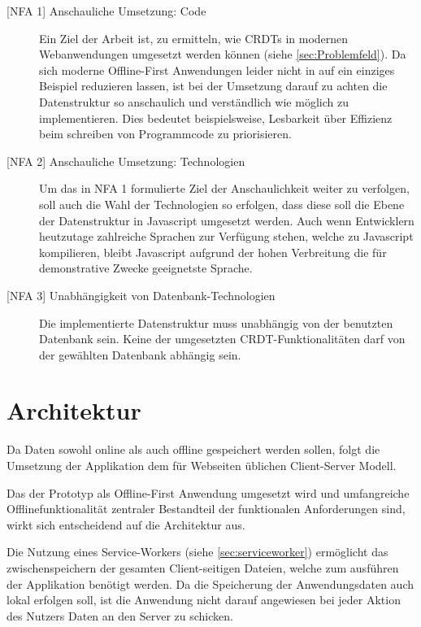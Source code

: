 \documentclass[a4paper, 12pt]{scrreprt}
\begin{document}
\begin{description}
	\item[{[NFA 1]} Anschauliche Umsetzung: Code]
	Ein Ziel der Arbeit ist, zu ermitteln, wie CRDTs in modernen Webanwendungen umgesetzt werden können (siehe \ref{sec:Problemfeld}). Da sich moderne Offline-First Anwendungen leider nicht in auf ein einziges Beispiel reduzieren lassen, ist bei der Umsetzung darauf zu achten die Datenstruktur so anschaulich und verständlich wie möglich zu implementieren. Dies bedeutet beispielsweise, Lesbarkeit über Effizienz beim schreiben von Programmcode zu priorisieren.
	\item[{[NFA 2]} Anschauliche Umsetzung: Technologien]
	Um das in NFA 1 formulierte Ziel der Anschaulichkeit weiter zu verfolgen, soll auch die Wahl der Technologien so erfolgen, dass diese soll die Ebene der Datenstruktur in Javascript umgesetzt werden. Auch wenn Entwicklern heutzutage zahlreiche Sprachen zur Verfügung stehen, welche zu Javascript kompilieren, bleibt Javascript aufgrund der hohen Verbreitung die für demonstrative Zwecke geeignetste Sprache.
	\item[{[NFA 3]} Unabhängigkeit von Datenbank-Technologien]
	Die implementierte Datenstruktur muss unabhängig von der benutzten Datenbank sein. Keine der umgesetzten CRDT-Funktionalitäten darf von der gewählten Datenbank abhängig sein.
\end{description}

\section{Architektur}
\label{sec:Architektur}

Da Daten sowohl online als auch offline gespeichert werden sollen, folgt die Umsetzung der Applikation dem für Webseiten üblichen Client-Server Modell. 

Das der Prototyp als Offline-First Anwendung umgesetzt wird und umfangreiche Offlinefunktionalität zentraler Bestandteil der funktionalen Anforderungen sind, wirkt sich entscheidend auf die Architektur aus.

Die Nutzung eines Service-Workers (siehe \ref{sec:serviceworker}) ermöglicht das zwischenspeichern der gesamten Client-seitigen Dateien, welche zum ausführen der Applikation benötigt werden. Da die Speicherung der Anwendungsdaten auch lokal erfolgen soll, ist die Anwendung nicht darauf angewiesen bei jeder Aktion des Nutzers Daten an den Server zu schicken.
\end{document}
